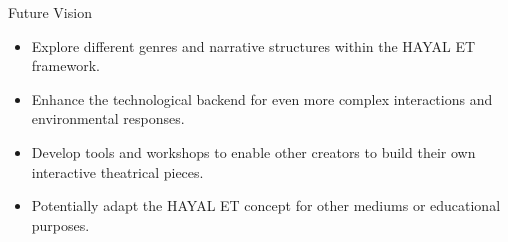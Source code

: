 \documentclass[aspectratio=169]{beamer}
\begin{document}
\begin{frame}{Future Vision}
    \begin{itemize}
        \item Explore different genres and narrative structures within the HAYAL ET framework.
        \item Enhance the technological backend for even more complex interactions and environmental responses.
        \item Develop tools and workshops to enable other creators to build their own interactive theatrical pieces.
        \item Potentially adapt the HAYAL ET concept for other mediums or educational purposes.
    \end{itemize}
\end{frame}
\end{document}
